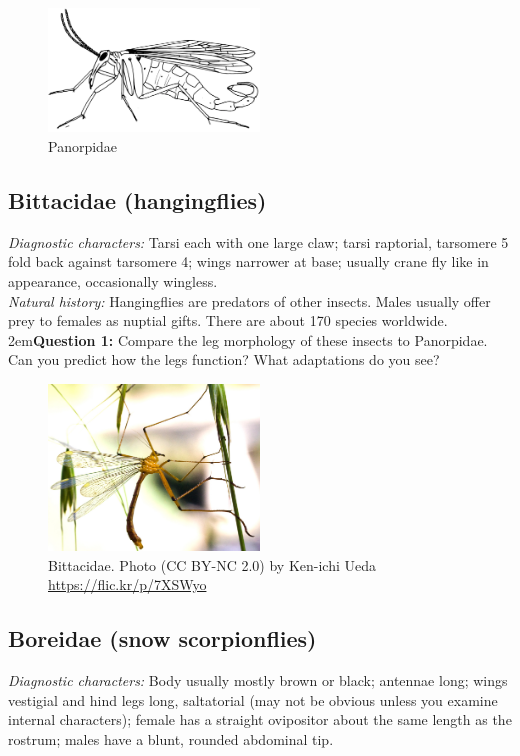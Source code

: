 \documentclass[letterpaper, 11pt]{article}
\begin{document}
\begin{figure}[ht!]
  \centering
    \includegraphics[width=0.5\textwidth]{panorpid.png}
  \caption{Panorpidae \citep[modified from Fig. 20 in][]{webb1975mecoptera}}
  \label{fig:panorpid}
\end{figure}

\subsection{Bittacidae (hangingflies)}
\noindent{}\textit{Diagnostic characters:} Tarsi each with one large claw; tarsi raptorial, tarsomere 5 fold back against tarsomere 4; wings narrower at base; usually crane fly like in appearance, occasionally wingless.\\

\noindent{}\textit{Natural history:} Hangingflies are predators of other insects. Males usually offer prey to females as nuptial gifts. There are about 170 species worldwide.\\

\hangindent2em\textbf{Question 1:} Compare the leg morphology of these insects to Panorpidae. Can you predict how the legs function? What adaptations do you see?

\begin{figure}[ht!]
  \centering
    \includegraphics[width=0.5\textwidth]{BittacidHabitus}
  \caption{Bittacidae. Photo (CC BY-NC 2.0) by Ken-ichi Ueda \url{https://flic.kr/p/7XSWyo}}
  \label{fig:bittacid}
\end{figure}

\subsection{Boreidae (snow scorpionflies)}
\noindent{}\textit{Diagnostic characters:} Body usually mostly brown or black; antennae long; wings vestigial and hind legs long, saltatorial (may not be obvious unless you examine internal characters); female has a straight ovipositor about the same length as the rostrum; males have a blunt, rounded abdominal tip.\\
\end{document}
